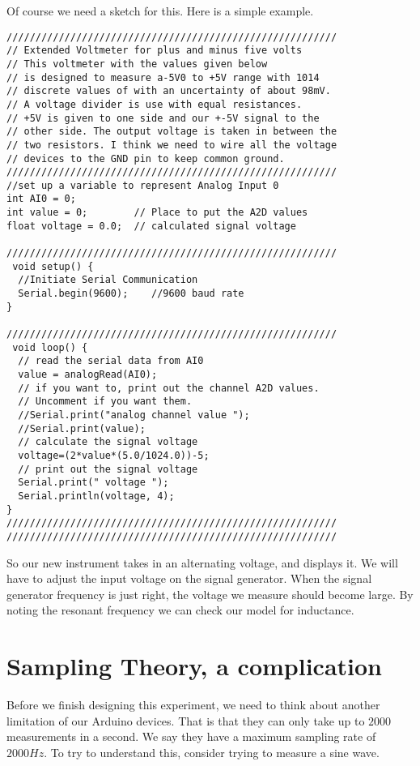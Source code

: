 Of course we need a sketch for this. Here is a simple example.
 \begin{lstlisting}[language=Arduino]
/////////////////////////////////////////////////////////
// Extended Voltmeter for plus and minus five volts
// This voltmeter with the values given below
// is designed to measure a-5V0 to +5V range with 1014 
// discrete values of with an uncertainty of about 98mV. 
// A voltage divider is use with equal resistances. 
// +5V is given to one side and our +-5V signal to the 
// other side. The output voltage is taken in between the 
// two resistors. I think we need to wire all the voltage 
// devices to the GND pin to keep common ground. 
/////////////////////////////////////////////////////////
//set up a variable to represent Analog Input 0
int AI0 = 0;          
int value = 0;        // Place to put the A2D values
float voltage = 0.0;  // calculated signal voltage
 
/////////////////////////////////////////////////////////
 void setup() {
  //Initiate Serial Communication
  Serial.begin(9600);    //9600 baud rate
}
 
/////////////////////////////////////////////////////////
 void loop() {
  // read the serial data from AI0
  value = analogRead(AI0);
  // if you want to, print out the channel A2D values. 
  // Uncomment if you want them.
  //Serial.print("analog channel value ");
  //Serial.print(value);
  // calculate the signal voltage 
  voltage=(2*value*(5.0/1024.0))-5;
  // print out the signal voltage
  Serial.print(" voltage ");
  Serial.println(voltage, 4);  
}
/////////////////////////////////////////////////////////
/////////////////////////////////////////////////////////
 \end{lstlisting}

So our new instrument takes in an alternating voltage, and displays it. We
will have to adjust the input voltage on the signal generator. When the
signal generator frequency is just right, the voltage we measure should
become large. By noting the resonant frequency we can check our model for
inductance.

\section{Sampling Theory, a complication}

Before we finish designing this experiment, we need to think about another
limitation of our Arduino devices. That is that they can only take up to $%
2000$ measurements in a second. We say they have a maximum sampling rate of $%
2000\unit{Hz}.$ To try to understand this, consider trying to measure a sine
wave.

